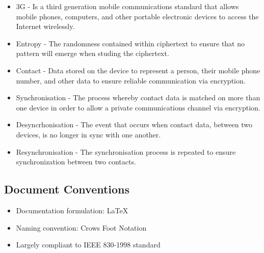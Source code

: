 \begin{itemize}
\item 3G - Is a third generation mobile communications standard that allows mobile phones, computers, and other portable electronic devices to access the Internet wirelessly.
\item Entropy -  The randomness contained within ciphertext to ensure that no pattern will emerge when studing the ciphertext.
\item Contact - Data stored on the device to represent a person, their mobile phone number, and other data to ensure reliable communication via encryption.
\item Synchronisation - The process whereby contact data is matched on more than one device in order to allow a private communications channel via encryption.
\item Desyncrhonisation - The event that occurs when contact data, between two devices, is no longer in sync with one another.
\item Resynchronisation - The synchronisation process is repeated to ensure synchronization between two contacts.

\end{itemize}

\subsection{Document Conventions}
\begin{itemize}
\item Documentation formulation: LaTeX
\item Naming convention: Crows Foot Notation
\item Largely compliant to IEEE 830-1998 standard
\end{itemize}

